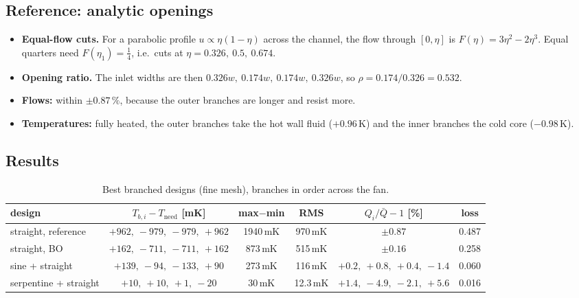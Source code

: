 \documentclass[11pt,a4paper]{article}
\newcommand{\Tneed}{T_\mathrm{need}}
\newcommand{\mK}{\ensuremath{\,\mathrm{mK}}}
\newcommand{\K}{\ensuremath{\,\mathrm{K}}}
\begin{document}
\subsection{Reference: analytic openings}
\begin{itemize}
  \item \textbf{Equal-flow cuts.} For a parabolic profile $u \propto \eta(1-\eta)$ across the channel,
        the flow through $[0,\eta]$ is $F(\eta) = 3\eta^2 - 2\eta^3$. Equal quarters need
        $F(\eta_1) = \tfrac14$, i.e.\ cuts at $\eta = 0.326,\ 0.5,\ 0.674$.
  \item \textbf{Opening ratio.} The inlet widths are then $0.326w,\ 0.174w,\ 0.174w,\ 0.326w$, so
        $\rho = 0.174/0.326 = 0.532$.
  \item \textbf{Flows:} within $\pm 0.87\,\%$, because the outer branches are longer and resist more.
  \item \textbf{Temperatures:} fully heated, the outer branches take the hot wall fluid ($+0.96\K$)
        and the inner branches the cold core ($-0.98\K$).
\end{itemize}

\subsection{Results}
\begin{table}[H]
\centering\footnotesize\setlength{\tabcolsep}{4pt}
\begin{tabular}{@{}lccccc@{}}
\toprule
design & $T_{b,i} - \Tneed$ [mK] & max$-$min & RMS & $Q_i/\bar Q - 1$ [\%] & loss \\
\midrule
straight, reference & $+962,\ -979,\ -979,\ +962$ & 1940\mK & 970\mK & $\pm 0.87$ & 0.487 \\
straight, BO & $+162,\ -711,\ -711,\ +162$ & 873\mK & 515\mK & $\pm 0.16$ & 0.258 \\
sine + straight & $+139,\ -94,\ -133,\ +90$ & 273\mK & 116\mK & $+0.2,\ +0.8,\ +0.4,\ -1.4$ & 0.060 \\
serpentine + straight & $+10,\ +10,\ +1,\ -20$ & 30\mK & 12.3\mK & $+1.4,\ -4.9,\ -2.1,\ +5.6$ & 0.016 \\
\bottomrule
\end{tabular}
\caption{Best branched designs (fine mesh), branches in order across the fan.}
\label{tab:branch}
\end{table}
\end{document}
